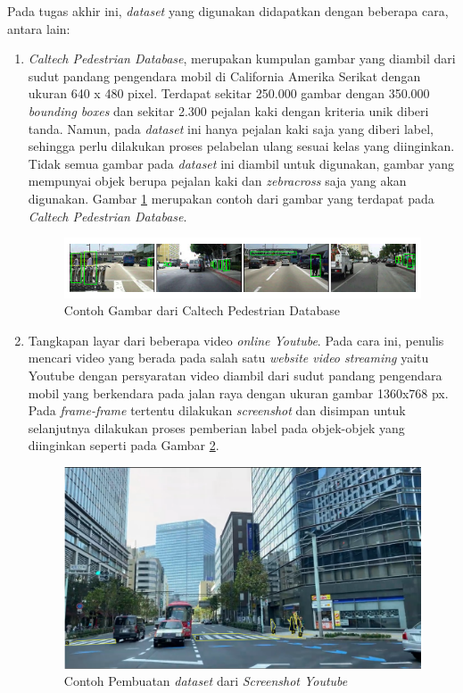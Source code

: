 Pada tugas akhir ini, \textit{dataset} yang digunakan didapatkan dengan beberapa cara, antara lain:
	\begin{enumerate}
		\item \textit{Caltech Pedestrian Database}, merupakan kumpulan gambar yang diambil dari sudut pandang pengendara mobil di California Amerika Serikat dengan ukuran 640 x 480 pixel. Terdapat sekitar 250.000 gambar dengan 350.000 \textit{bounding boxes} dan sekitar 2.300 pejalan kaki dengan kriteria unik diberi tanda. Namun, pada \textit{dataset} ini hanya pejalan kaki saja yang diberi label, sehingga perlu dilakukan proses pelabelan ulang sesuai kelas yang diinginkan. Tidak semua gambar pada \textit{dataset} ini diambil untuk digunakan, gambar yang mempunyai objek berupa pejalan kaki dan \textit{zebracross} saja yang akan digunakan. Gambar \ref{fig:caltech} merupakan contoh dari gambar yang terdapat pada \textit{Caltech Pedestrian Database}.
		\begin{figure}[ht]
			\centering
			\includegraphics[scale=0.35]{gambar/caltech.png}
			\caption{Contoh Gambar dari Caltech Pedestrian Database}
			\label{fig:caltech}
		\end{figure} 
		
		\item Tangkapan layar dari beberapa video \textit{online Youtube}. Pada cara ini, penulis mencari video yang berada pada salah satu \textit{website video streaming} yaitu Youtube dengan persyaratan video diambil dari sudut pandang pengendara mobil yang berkendara pada jalan raya dengan ukuran gambar 1360x768 px. Pada \textit{frame-frame} tertentu dilakukan \textit{screenshot} dan disimpan untuk selanjutnya dilakukan proses pemberian label pada objek-objek yang diinginkan seperti pada Gambar \ref{fig:youtube-dataset}. 
		
		\begin{figure}[ht]
			\centering
			\includegraphics[scale=0.15]{gambar/youtube-dataset.png}
			\caption{Contoh Pembuatan \textit{dataset} dari \textit{Screenshot Youtube}}
			\label{fig:youtube-dataset}
		\end{figure}
		

\end{enumerate}
